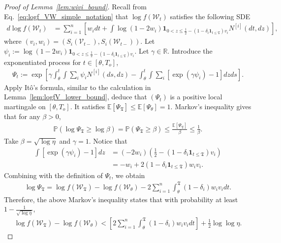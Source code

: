 \documentclass[11pt]{article}
\newcommand{\stopT}{{\boldsymbol{\mathfrak{T}}}}
\newcommand{\To}{{T_o}}
\newcommand{\psiW}{\psi}
\newcommand{\PsiW}{\Psi}
\newcommand{\rV}{\mathscr{V}}
\newcommand{\rW}{\mathscr{W}}
\newcommand{\Ni}{N^{[i]}}
\theoremstyle{named}
\theoremstyle{plain}
\newcommand{\defn}{:=}
\newcommand{\real}{\ensuremath{\mathbb{R}}}
\newcommand{\Exs}{\ensuremath{{\mathbb{E}}}}
\newcommand{\Prob}{\ensuremath{{\mathbb{P}}}}
\newcommand{\brackets}[1]{\left[ #1 \right]}
\newcommand{\parenth}[1]{\left( #1 \right)}
\begin{document}
\begin{proof}[Proof of Lemma~\ref{lem:wivi_bound}\label{proof_lem:wivi_bound}]
  Recall from Eq.~\eqref{eq:logf_VW_simple_notation} that $\log f(\rW_t)$ satisfies the following SDE
  \begin{align*}
    d \log f(\rW_t) &= \sum_{i=1}^n \brackets{w_i dt + \int \log \parenth{1-2w_i} \mathbf{1}_{0 < z \leq \frac12 - (1 - \delta_i \mathbf{1}_{t \leq \stopT})v_i} \Ni(dt, dz)},
  \end{align*}
  where $(v_i, w_i) = (S_i(\rV_{t-}), S_i(\rW_{t-}))$. Let $\psiW_i \defn \log \parenth{1-2w_i} \mathbf{1}_{0 < z \leq \frac12 - (1 - \delta_i \mathbf{1}_{t \leq \stopT})v_i}$. Let $\gamma \in \real$. Introduce the exponentiated process for $t \in [\theta, \To]$,
  \begin{align*}
    \PsiW_t \defn \exp\brackets{\gamma \int_\theta^t \int \sum_i \psiW_i \Ni(ds, dz) - \int_\theta^t \int \sum_i \brackets{\exp(\gamma \psiW_i) - 1} dz ds }.
  \end{align*}
  Apply It\^o's formula, similar to the calculation in Lemma~\ref{lem:logfV_lower_bound}, deduce that $(\PsiW_t)$ is a positive local martingale on $[\theta, \To]$. It satisfies $\Exs[\PsiW_{\stopT}] \leq \Exs[\PsiW_\theta]= 1$. Markov's inequality gives that for any $\beta > 0$,
  \begin{align*}
    \Prob(\log \PsiW_\stopT \geq \log \beta) = \Prob(\PsiW_\stopT \geq \beta) \leq \frac{\Exs[\PsiW_\stopT]}{\beta} \leq \frac{1}{\beta}.
  \end{align*}
  Take $\beta = \sqrt{\log \eta}$ and $\gamma = 1$. Notice that
  \begin{align*}
    \int [\exp(\gamma \psiW_i) - 1 ] dz &= (-2w_i) \parenth{\frac12 - (1-\delta_i \mathbf{1}_{t \leq \stopT}) v_i} \\
    &= - w_i + 2 (1-\delta_i \mathbf{1}_{t \leq \stopT}) w_i v_i.
  \end{align*}
  Combining with the definition of $\PsiW_t$, we obtain
  \begin{align*}
    \log \PsiW_\stopT = \log f (\rW_\stopT) - \log f(\rW_\theta) - 2 \sum_{i=1}^n \int_\theta^\stopT (1-\delta_i) w_i v_i dt.
  \end{align*}
  Therefore, the above Markov's inequality states that with probability at least $1 - \frac{1}{\sqrt{\log \eta}}$,
  \begin{align*}
    \log f(\rW_{\stopT}) -  \log f (\rW_{\theta}) < \brackets{2 \sum_{i=1}^n \int_\theta^\stopT   (1-\delta_i) w_i v_i dt } + \frac{1}{2} \log\log\eta.
  \end{align*}
  
\end{proof}
\end{document}
